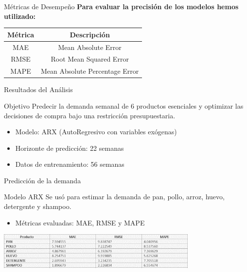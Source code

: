 \documentclass{beamer}
\begin{document}
\begin{frame}{Métricas de Desempeño}
  \vspace{0.3cm}
  \textbf{Para evaluar la precisión de los modelos hemos utilizado:}
  \vspace{0.5cm}
  \begin{table}
      \centering
      \renewcommand{\arraystretch}{1.3}
      \begin{tabular}{|c|c|}
           \hline
           \textbf{Métrica} & \textbf{Descripción} \\ \hline
           MAE & Mean Absolute Error \\ \hline
           RMSE & Root Mean Squared Error \\ \hline
           MAPE & Mean Absolute Percentage Error \\ \hline
      \end{tabular}
      \label{tab:my_label}
  \end{table}
\end{frame}
\begin{frame}{Resultados del An\'alisis}
\begin{block}{Objetivo}
Predecir la demanda semanal de 6 productos esenciales y optimizar las decisiones de compra bajo una restricci\'on presupuestaria.
\end{block}
\begin{itemize}
    \item Modelo: ARX (AutoRegresivo con variables ex\'ogenas)
    \item Horizonte de predicci\'on: 22 semanas
    \item Datos de entrenamiento: 56 semanas
\end{itemize}
\end{frame}

\begin{frame}{ Predicci\'on de la demanda}
\begin{block}{Modelo ARX}
Se us\'o para estimar la demanda de pan, pollo, arroz, huevo, detergente y shampoo.
\end{block}
\begin{itemize}
    \item M\'etricas evaluadas: MAE, RMSE y MAPE
\end{itemize}
\vspace{0.3cm}
\includegraphics[width=0.75\textwidth]{error.png}
\end{frame}
\end{document}
